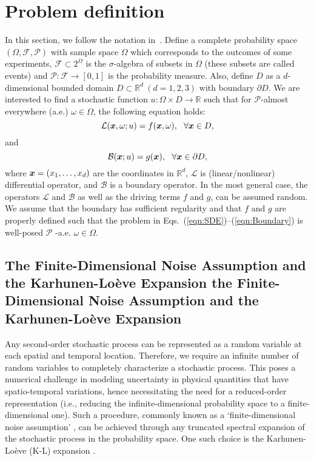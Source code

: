 \documentclass[article,authoryear,jfv]{beg_32}             %
\begin{document}
\section{Problem definition}
\label{sec:ProblemDef} In this section, we follow the notation
in~\cite{Xiang,Ghanem}.  Define a complete probability space
$(\Omega,\mathcal{F},\mathcal{P})$ with sample space $\Omega$ which
corresponds to the outcomes of some experiments,
$\mathcal{F}\subset 2^\Omega$ is the $\sigma$-algebra of subsets in
$\Omega$ (these subsets are called events) and
$\mathcal{P}:\mathcal{F}\rightarrow[0,1]$ is the probability
measure. Also, define $D$ as a $d$-dimensional bounded domain
$D\subset\mathbb{R}^d \ (d=1,2,3)$ with boundary $\partial D$. We
are interested to find a stochastic function $u:\Omega \times D
\rightarrow \mathbb{R}$ such that for $\mathcal{P}$-almost
everywhere (a.e.) $\omega \in \Omega$, the following equation holds:
\begin{equation}
  \mathcal{L}(\mbox{\boldmath $x$},\omega;u) = f(\mbox{\boldmath $x$},\omega),~~\forall \mbox{\boldmath $x$} \in D,
  \label{eqn:SDE}
\end{equation}
\noindent
and
\begin{equation}
  \mathcal{B}(\mbox{\boldmath $x$};u) = g(\mbox{\boldmath $x$}),~~\forall \mbox{\boldmath $x$} \in \partial D,
  \label{eqn:Boundary}
\end{equation}
\noindent
where $\mbox{\boldmath $x$} = (x_1,\dots,x_d)$ are the coordinates
in $\mathbb{R}^d$, $\mathcal{L}$ is (linear/nonlinear) differential
operator, and $\mathcal{B}$ is a boundary operator. In the most
general case, the operators $\mathcal{L}$ and $\mathcal{B}$ as well
as the driving terms $f$ and $g$, can be assumed random. We assume
that the boundary has sufficient regularity and that $f$ and $g$ are
properly defined such that the problem in
Eqs.~(\ref{eqn:SDE})--(\ref{eqn:Boundary}) is well-posed
$\mathcal{P}$ -a.e. $\omega \in \Omega$.




\subsection{The Finite-Dimensional Noise Assumption and the Karhunen-Lo\`eve
Expansion the Finite-Dimensional Noise Assumption and the Karhunen-Lo\`eve
Expansion}\label{sec:KLE} Any second-order stochastic process can be
represented as a random variable at each spatial and temporal
location. Therefore, we require an infinite number of random
variables to completely characterize a stochastic process. This
poses a numerical challenge in modeling uncertainty in physical
quantities that have spatio-temporal variations, hence necessitating
the need for a reduced-order representation (i.e., reducing the
infinite-dimensional probability space to a finite-dimensional one).
Such a procedure, commonly known as a `finite-dimensional noise
assumption' \cite{FooPhD,2006AIPC..845..479B}, can be achieved through any
truncated spectral expansion of the stochastic process in the
probability space. One such choice  is the Karhunen-Lo\`eve (K-L)
expansion \cite{Ghanem}.
\end{document}
